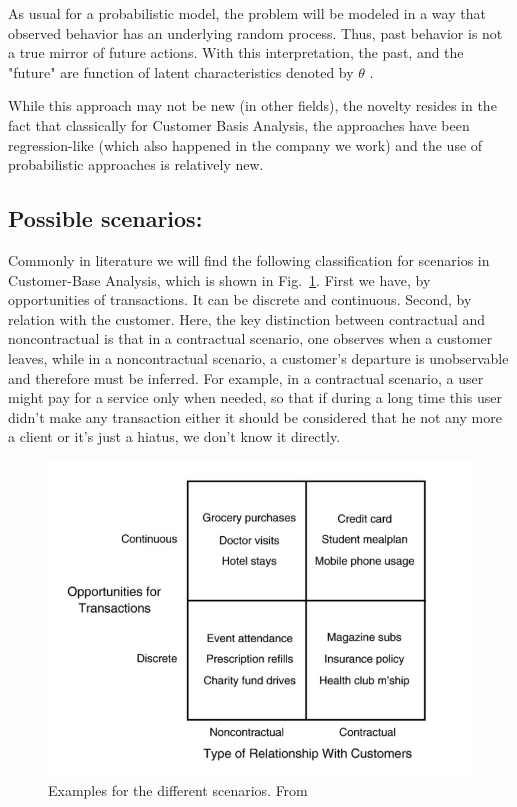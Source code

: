 \documentclass[paper=a4, fontsize=11pt]{scrartcl} %
\numberwithin{equation}{section} %
\numberwithin{figure}{section} %
\numberwithin{table}{section} %
\begin{document}
As usual for a probabilistic model, the problem will be modeled in a way that observed behavior has an underlying random process. Thus, past behavior is not a true mirror of future actions. With this interpretation, the past, and the "future" are function of latent characteristics denoted by $\theta$ .

While this approach may not be new (in other fields), the novelty resides in the fact that classically for Customer Basis Analysis, the approaches have been regression-like (which also happened in the company we work) and the use of probabilistic approaches is relatively new.

\subsection{Possible scenarios:}

Commonly in literature we will find the following classification for scenarios in Customer-Base Analysis, which is shown in Fig.~\ref{fig:Relation}.
First we have, by opportunities of transactions. It can be discrete and continuous. Second, by relation with the customer. Here, the key distinction between contractual and noncontractual is that in a contractual scenario, one observes when a customer leaves, while in a noncontractual scenario, a customer's departure is unobservable and therefore must be inferred. For example, in a contractual scenario, a user might pay for a service only when needed, so that if during a long time this user didn't make any transaction either it should be considered that he not any more a client or it's just a hiatus, we don't know it directly.

\begin{figure}[h!]
\centering
  \includegraphics[scale = 0.75]{CustomerRelation.png}
  \caption{Examples for the different scenarios. From \cite{fader09} }
  \label{fig:Relation}
\end{figure}
\end{document}
